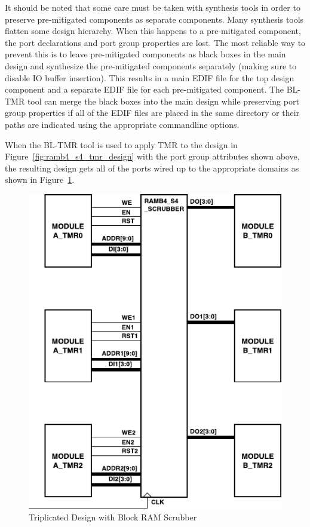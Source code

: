 It should be noted that some care must be taken with synthesis tools in order
to preserve pre-mitigated components as separate components. Many synthesis
tools flatten some design hierarchy. When this happens to a pre-mitigated
component, the port declarations and port group properties are lost. The most
reliable way to prevent this is to leave pre-mitigated components as black
boxes in the main design and synthesize the pre-mitigated components separately
(making sure to disable IO buffer insertion). This results in a main EDIF
file for the top design component and a separate EDIF file for each
pre-mitigated component. The BL-TMR tool can merge the black boxes into the main
design while preserving port group properties if all of the EDIF files are
placed in the same directory or their paths are indicated using the appropriate
commandline options.

When the BL-TMR tool is used to apply TMR to the design in
Figure~\ref{fig:ramb4_s4_tmr_design} with the port group attributes shown above,
the resulting design gets all of the ports wired up to the appropriate domains
as shown in Figure~\ref{fig:ramb4_s4_tmr_result}.

\begin{figure}[htb]
\begin{center}
\includegraphics[scale=1]{ramb4_s4_tmr_result.pdf}
\caption{Triplicated Design with Block RAM Scrubber}
\label{fig:ramb4_s4_tmr_result}
\end{center}
\end{figure}

